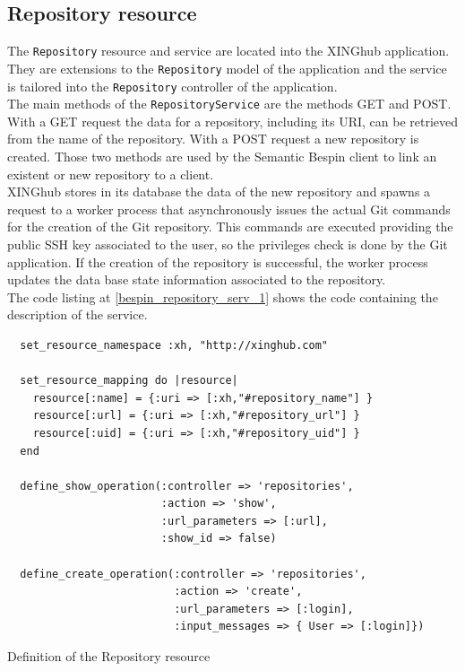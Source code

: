 \subsection{Repository resource}

The \texttt{Repository} resource and service are located into the XINGhub application. They are extensions to the
\texttt{Repository} model of the application and the service is tailored into the \texttt{Repository} controller of the
application.\\

The main methods of the \texttt{RepositoryService} are the methods GET and POST. With a GET request the data for
a repository, including its URI,  can be retrieved from the name of the repository. With a POST request a new repository
is created. Those two methods are used by the Semantic Bespin client to link an existent or new repository to a
client.\\

XINGhub stores in its database the data of the new repository and spawns a request to a worker process that
asynchronously issues the actual Git commands for the creation of the Git repository. This commands are executed providing the public SSH key
associated to the user, so the privileges check is done by the Git application. If the creation of the repository is
successful, the worker process updates the data base state information associated to the repository.\\

The code listing at \ref{bespin_repository_serv_1} shows the code containing the description of the service.


\begin{table}
\vspace{5 mm}
\begin{lstlisting}
  set_resource_namespace :xh, "http://xinghub.com"

  set_resource_mapping do |resource|
    resource[:name] = {:uri => [:xh,"#repository_name"] }
    resource[:url] = {:uri => [:xh,"#repository_url"] }
    resource[:uid] = {:uri => [:xh,"#repository_uid"] }
  end

  define_show_operation(:controller => 'repositories',
                        :action => 'show',
                        :url_parameters => [:url],
                        :show_id => false)

  define_create_operation(:controller => 'repositories',
                          :action => 'create',
                          :url_parameters => [:login],
                          :input_messages => { User => [:login]})
\end{lstlisting} 
\vspace{5 mm}
\caption{Definition of the Repository resource}
\label{bespin_repository_serv_1}
\end{table}


